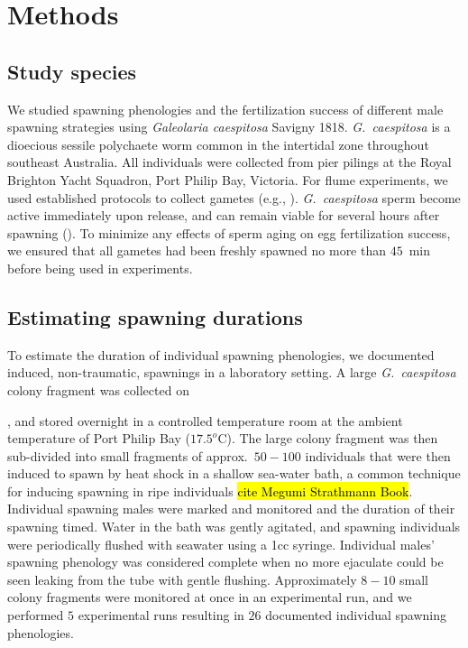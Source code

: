\documentclass{article}
\begin{document}
\section*{Methods}

	\subsection*{Study species}
	We studied spawning phenologies and the fertilization success of different male spawning strategies using \textit{Galeolaria caespitosa} Savigny 1818. \textit{G.~caespitosa} is a dioecious sessile polychaete worm common in the intertidal zone throughout southeast Australia. All individuals were collected from pier pilings at the Royal Brighton Yacht Squadron, Port Philip Bay, Victoria. For flume experiments, we used established protocols to collect gametes (e.g., \citealt{MarshallEvans2005a, MarshallEvans2005b}). \textit{G.~caespitosa} sperm become active immediately upon release, and can remain viable for several hours after spawning (\citealt{Kupriyanova2013}). To minimize any effects of sperm aging on egg fertilization success, we ensured that all gametes had been freshly spawned no more than $45$~min before being used in experiments.

	\subsection*{Estimating spawning durations}
	To estimate the duration of individual spawning phenologies, we documented induced, non-traumatic, spawnings in a laboratory setting. A large \textit{G.~caespitosa} colony fragment was collected on \date{16/11/16}, and stored overnight in a controlled temperature room at the ambient temperature of Port Philip Bay ($17.5^o$C). The large colony fragment was then sub-divided into small fragments of approx.~$50-100$ individuals that were then induced to spawn by heat shock in a shallow sea-water bath, a common technique for inducing spawning in ripe individuals \hl{cite Megumi Strathmann Book}. Individual spawning males were marked and monitored and the duration of their spawning timed. Water in the bath was gently agitated, and spawning individuals were periodically flushed with seawater using a 1cc syringe. Individual males' spawning phenology was considered complete when no more ejaculate could be seen leaking from the tube with gentle flushing. Approximately $8-10$ small colony fragments were monitored at once in an experimental run, and we performed $5$ experimental runs resulting in $26$ documented individual spawning phenologies. 
\end{document}
